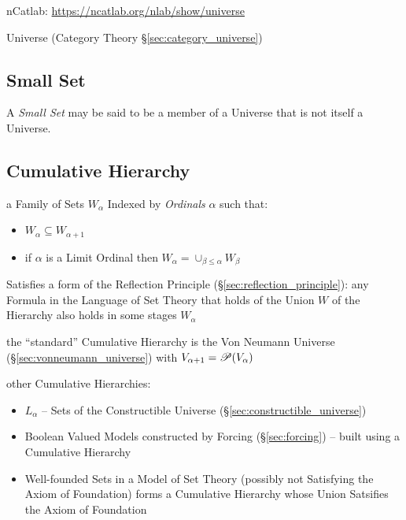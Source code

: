 nCatlab: \url{https://ncatlab.org/nlab/show/universe}

\fist Universe (Category Theory \S\ref{sec:category_universe})




\subsection{Small Set}\label{sec:small_set}

A \emph{Small Set} may be said to be a member of a Universe that is
not itself a Universe.



\subsection{Cumulative Hierarchy}\label{sec:cumulative_hierarchy}

a Family of Sets $W_\alpha$ Indexed by \emph{Ordinals} $\alpha$ such
that:
\begin{itemize}
  \item $W_\alpha \subseteq W_{\alpha+1}$
  \item if $\alpha$ is a Limit Ordinal then $W_\alpha = \cup_{\beta
    \leq \alpha} W_\beta$
\end{itemize}

Satisfies a form of the Reflection Principle
(\S\ref{sec:reflection_principle}): any Formula in the Language of Set
Theory that holds of the Union $W$ of the Hierarchy also holds in some
stages $W_\alpha$

the ``standard'' Cumulative Hierarchy is the Von Neumann Universe
(\S\ref{sec:vonneumann_universe}) with $V_{\alpha+1} = \mathscr{P}(V_\alpha)$

other Cumulative Hierarchies:
\begin{itemize}
  \item $L_\alpha$ -- Sets of the Constructible Universe
    (\S\ref{sec:constructible_universe})
  \item Boolean Valued Models constructed by Forcing
    (\S\ref{sec:forcing}) -- built using a Cumulative Hierarchy
  \item Well-founded Sets in a Model of Set Theory (possibly not
    Satisfying the Axiom of Foundation) forms a Cumulative Hierarchy
    whose Union Satsifies the Axiom of Foundation
\end{itemize}



